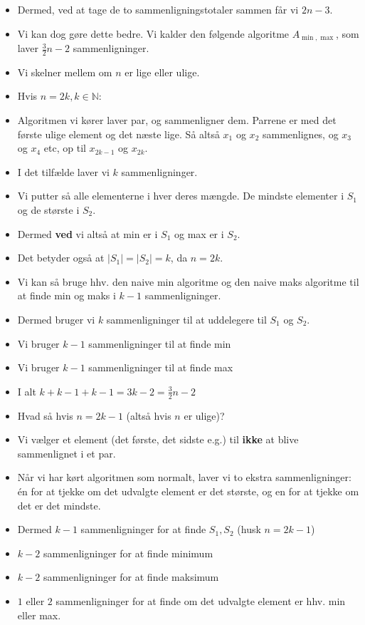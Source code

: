 \begin{frame}[allowframebreaks]
\begin{itemize}
		\item Dermed, ved at tage de to sammenligningstotaler sammen får vi $2n-3$.
		\item Vi kan dog gøre dette bedre. Vi kalder den følgende algoritme $A_{\min, \max}$, som laver $\frac{3}{2}n - 2$ sammenligninger.
		\item Vi skelner mellem om $n$ er lige eller ulige.
		\item Hvis $n = 2k, k \in \mathbb{N}$:
		\item Algoritmen vi kører laver par, og sammenligner dem. Parrene er med det første ulige element og det næste lige. Så altså $x_{1}$ og $x_{2}$ sammenlignes, og $x_{3}$ og $x_{4}$ etc, op til $x_{2k-1}$ og $x_{2k}$.
		\item I det tilfælde laver vi $k$ sammenligninger.
		\item Vi putter så alle elementerne i hver deres mængde. De mindste elementer i $S_{1}$ og de største i $S_{2}$.
		\item Dermed \textbf{ved} vi altså at min er i $S_{1}$ og max er i $S_{2}$.
		\item Det betyder også at $|S_{1}| = |S_{2}| = k$, da $n = 2k$.
		\item Vi kan så bruge hhv. den naive min algoritme og den naive maks algoritme til at finde min og maks i $k-1$ sammenligninger.
		\item Dermed bruger vi $k$ sammenligninger til at uddelegere til $S_{1}$ og $S_{2}$.
		\item Vi bruger $k-1$ sammenligninger til at finde min
		\item Vi bruger $k-1$ sammenligninger til at finde max
		\item I alt $k + k-1 + k-1 = 3k-2 = \frac{3}{2}n - 2$
		\item Hvad så hvis $n = 2k-1$ (altså hvis $n$ er ulige)?
		\item Vi vælger et element (det første, det sidste e.g.) til \textbf{ikke} at blive sammenlignet i et par.
		\item Når vi har kørt algoritmen som normalt, laver vi to ekstra sammenligninger: én for at tjekke om det udvalgte element er det største, og en for at tjekke om det er det mindste.
		\item Dermed $k-1$ sammenligninger for at finde $S_{1}, S_{2}$ (husk $n = 2k-1$)
		\item $k-2$ sammenligninger for at finde minimum
		\item $k-2$ sammenligninger for at finde maksimum
		\item $1$ eller $2$ sammenligninger for at finde om det udvalgte element er hhv. min eller max.

\end{itemize}
\end{frame}

